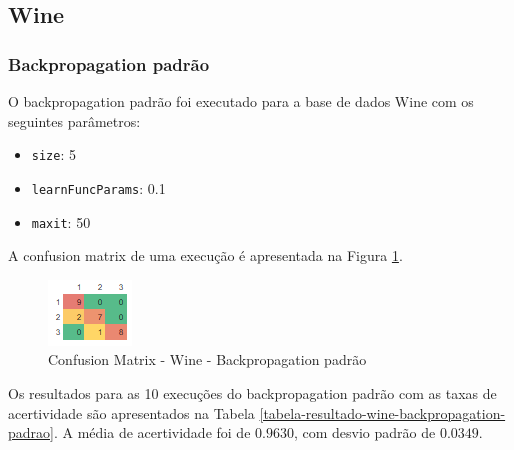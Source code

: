 \subsection{Wine}

\subsubsection{Backpropagation padrão}

O backpropagation padrão foi executado para a base de dados Wine com os seguintes parâmetros:

\begin{itemize}
	\item \texttt{size}: 5
	\item \texttt{learnFuncParams}: 0.1
	\item \texttt{maxit}: 50
\end{itemize}

A confusion matrix de uma execução é apresentada na Figura \ref{figura-confusion-matrix-wine-backpropagation-padrao}.

\begin{figure}[h!]
  \centering
  \includegraphics[width=0.3\linewidth]{figs/confusion-matrix-wine-backpropagation-padrao.png}
  \caption{Confusion Matrix - Wine - Backpropagation padrão}
  \label{figura-confusion-matrix-wine-backpropagation-padrao}
\end{figure}

Os resultados para as 10 execuções do backpropagation padrão com as taxas de acertividade são apresentados na Tabela \ref{tabela-resultado-wine-backpropagation-padrao}. A média de acertividade foi de $0.9630$, com desvio padrão de $0.0349$.

